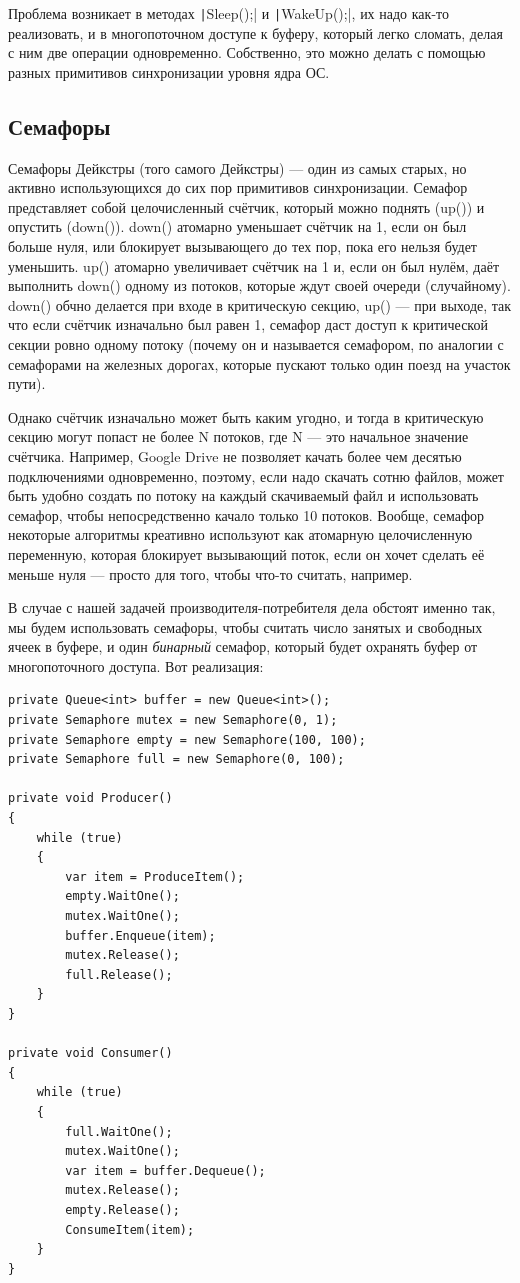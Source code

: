 \documentclass[a5paper]{article}
\begin{document}
Проблема возникает в методах \texttt|Sleep();| и \texttt|WakeUp();|, их надо как-то реализовать, и в многопоточном доступе к буферу, который легко сломать, делая с ним две операции одновременно. Собственно, это можно делать с помощью разных примитивов синхронизации уровня ядра ОС.

\subsection{Семафоры}

Семафоры Дейкстры (того самого Дейкстры) --- один из самых старых, но активно использующихся до сих пор примитивов синхронизации. Семафор представляет собой целочисленный счётчик, который можно поднять (up()) и опустить (down()). down() атомарно уменьшает счётчик на 1, если он был больше нуля, или блокирует вызывающего до тех пор, пока его нельзя будет уменьшить. up() атомарно увеличивает счётчик на 1 и, если он был нулём, даёт выполнить down() одному из потоков, которые ждут своей очереди (случайному). down() обчно делается при входе в критическую секцию, up() --- при выходе, так что если счётчик изначально был равен 1, семафор даст доступ к критической секции ровно одному потоку (почему он и называется семафором, по аналогии с семафорами на железных дорогах, которые пускают только один поезд на участок пути). 

Однако счётчик изначально может быть каким угодно, и тогда в критическую секцию могут попаст не более N потоков, где N --- это начальное значение счётчика. Например, Google Drive не позволяет качать более чем десятью подключениями одновременно, поэтому, если надо скачать сотню файлов, может быть удобно создать по потоку на каждый скачиваемый файл и использовать семафор, чтобы непосредственно качало только 10 потоков. Вообще, семафор некоторые алгоритмы креативно используют как атомарную целочисленную переменную, которая блокирует вызывающий поток, если он хочет сделать её меньше нуля --- просто для того, чтобы что-то считать, например.

В случае с нашей задачей производителя-потребителя дела обстоят именно так, мы будем использовать семафоры, чтобы считать число занятых и свободных ячеек в буфере, и один \textit{бинарный} семафор, который будет охранять буфер от многопоточного доступа. Вот реализация:

\begin{verbatim}
private Queue<int> buffer = new Queue<int>();
private Semaphore mutex = new Semaphore(0, 1);
private Semaphore empty = new Semaphore(100, 100);
private Semaphore full = new Semaphore(0, 100);

private void Producer()
{
    while (true)
    {
        var item = ProduceItem();
        empty.WaitOne();
        mutex.WaitOne();
        buffer.Enqueue(item);
        mutex.Release();
        full.Release();
    }
}

private void Consumer()
{
    while (true)
    {
        full.WaitOne();
        mutex.WaitOne();
        var item = buffer.Dequeue();
        mutex.Release();
        empty.Release();
        ConsumeItem(item);
    }
}
\end{verbatim}
\end{document}
